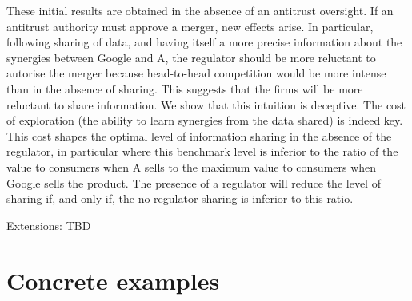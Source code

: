 \documentclass[a4paper,leqno]{article}%
\begin{document}
These initial results are obtained in the absence of an antitrust oversight. If an antitrust authority must approve a merger, new effects arise. In particular, following sharing of data, and having itself a more precise information about the synergies between Google and A, the regulator should be more reluctant to autorise the merger because head-to-head competition would be more intense than in the absence of sharing. This suggests that the firms will be more reluctant to share information. We show that this intuition is deceptive. The cost of exploration (the ability to learn synergies from the data shared) is indeed key. This cost shapes the optimal level of information sharing in the absence of the regulator, in particular where this benchmark level is inferior to the ratio of the value to consumers when A sells to the maximum value to consumers when Google sells the product. The presence of a regulator will reduce the level of sharing if, and only if, the no-regulator-sharing is inferior to this ratio.

Extensions: TBD


\section{Concrete examples}
\end{document}
